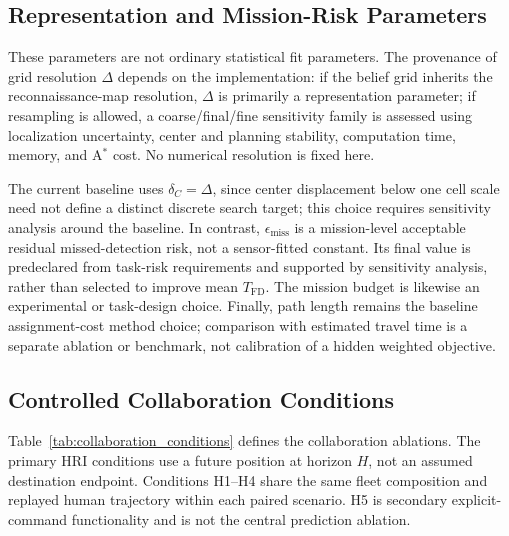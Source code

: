 \documentclass[letterpaper, 10pt, conference]{ieeeconf}
\begin{document}
\subsection{Representation and Mission-Risk Parameters}

These parameters are not ordinary statistical fit parameters. The provenance of grid resolution \(\Delta\) depends on the implementation: if the belief grid inherits the reconnaissance-map resolution, \(\Delta\) is primarily a representation parameter; if resampling is allowed, a coarse/final/fine sensitivity family is assessed using localization uncertainty, center and planning stability, computation time, memory, and A\(^\ast\) cost. No numerical resolution is fixed here.

The current baseline uses \(\delta_C=\Delta\), since center displacement below one cell scale need not define a distinct discrete search target; this choice requires sensitivity analysis around the baseline. In contrast, \(\epsilon_{\mathrm{miss}}\) is a mission-level acceptable residual missed-detection risk, not a sensor-fitted constant. Its final value is predeclared from task-risk requirements and supported by sensitivity analysis, rather than selected to improve mean \(T_{\mathrm{FD}}\). The mission budget is likewise an experimental or task-design choice. Finally, path length remains the baseline assignment-cost method choice; comparison with estimated travel time is a separate ablation or benchmark, not calibration of a hidden weighted objective.

\subsection{Controlled Collaboration Conditions}

Table~\ref{tab:collaboration_conditions} defines the collaboration ablations. The primary HRI conditions use a future position at horizon \(H\), not an assumed destination endpoint. Conditions H1--H4 share the same fleet composition and replayed human trajectory within each paired scenario. H5 is secondary explicit-command functionality and is not the central prediction ablation.
\end{document}
